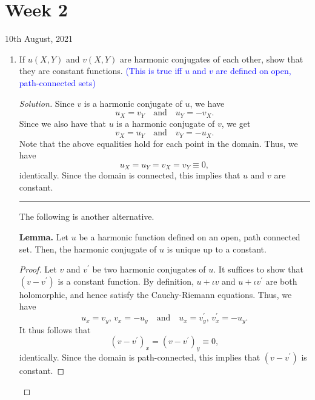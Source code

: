 \documentclass[11pt]{article}
\theoremstyle{definition}
\newenvironment{blockquote}
{\begin{mdframed}[skipabove=0pt, skipbelow=0pt, innertopmargin=4pt, innerbottommargin=4pt, bottomline=false,topline=false,rightline=false, linewidth=2pt]}
{\end{mdframed}}
\newenvironment{soln}{\begin{proof}[Solution]}{\end{proof}}
\begin{document}
\section{Week 2}
\begin{center}
    10th August, 2021
\end{center}
\begin{enumerate}[leftmargin=*]
    \itemsep0.5em
    \item If $u(X,Y)$ and $v(X,Y)$ are harmonic conjugates of each other, show that they are constant functions. \textcolor{blue}{(This is true iff $u$ and $v$ are defined on open, path-connected sets)}
    \begin{soln}
        Since $v$ is a harmonic conjugate of $u$, we have
        \[
            u_X = v_Y \quad \text{and} \quad u_Y = -v_X.
        \]
        Since we also have that $u$ is a harmonic conjugate of $v$, we get
        \[
            v_X = u_Y \quad \text{and} \quad v_Y = -u_X.
        \]
        Note that the above equalities hold for each point in the domain. Thus, we have
        \[
            u_X = u_Y = v_X = v_Y \equiv 0, 
        \]
        identically. Since the domain is connected, this implies that $u$ and $v$ are constant. 
        
        \par\noindent\rule{\textwidth}{0.2pt}
        
        The following is another alternative. 
        
        \medskip
        
        \begin{blockquote}
            \textbf{Lemma.} Let $u$ be a harmonic function defined on an open, path connected set. Then, the harmonic conjugate of $u$ is unique up to a constant.
            
            \begin{proof}
                Let $v$ and $v^{\prime}$ be two harmonic conjugates of $u$. It suffices to show that $(v-v^{\prime})$ is a constant function. By definition, $u+\iota v$ and $u + \iota v^{\prime}$ are both holomorphic, and hence satisfy the Cauchy-Riemann equations. Thus, we have
                \[
                    u_x = v_y, \, v_x = -u_y \quad \text{and} \quad u_x = v^{\prime}_y, \, v^{\prime}_x = -u_y.
                \]
                It thus follows that
                \[
                    (v-v^{\prime})_x = (v-v^{\prime})_y \equiv 0,
                \]
                identically. Since the domain is path-connected, this implies that $(v-v^{\prime})$ is constant. 
            \end{proof}
        \end{blockquote}
        

\end{soln}
\end{enumerate}
\end{document}
